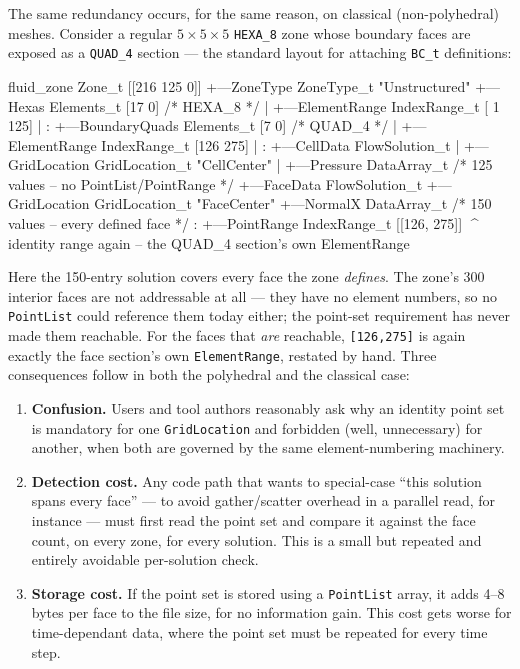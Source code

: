 \documentclass[11pt,letterpaper]{article}
\makeatletter
\let\cgns@orig@lstlisting\lstlisting
\let\cgns@endorig@lstlisting\endlstlisting
\renewenvironment{lstlisting}
  {\par\needspace{5\baselineskip}\nolinenumbers\cgns@orig@lstlisting}
  {\cgns@endorig@lstlisting\par\linenumbers}
\makeatother
\begin{document}
The same redundancy occurs, for the same reason, on classical
(non-polyhedral) meshes. Consider a regular $5{\times}5{\times}5$
\texttt{HEXA\_8} zone whose boundary faces are exposed as a
\texttt{QUAD\_4} section --- the standard layout for attaching
\texttt{BC\_t} definitions:

\begin{lstlisting}[language=C]
fluid_zone Zone_t [[216  125  0]]
+---ZoneType ZoneType_t "Unstructured"
+---Hexas Elements_t [17  0]           /* HEXA_8 */
|   +---ElementRange IndexRange_t [  1 125]
|   :
+---BoundaryQuads Elements_t [7  0]    /* QUAD_4 */
|   +---ElementRange IndexRange_t [126 275]
|   :
+---CellData FlowSolution_t
|   +---GridLocation GridLocation_t "CellCenter"
|   +---Pressure DataArray_t   /* 125 values -- no PointList/PointRange */
+---FaceData FlowSolution_t
    +---GridLocation GridLocation_t "FaceCenter"
    +---NormalX DataArray_t     /* 150 values -- every defined face */
    :
    +---PointRange IndexRange_t [[126, 275]]
        ^^^^ identity range again -- the QUAD_4 section's own ElementRange
\end{lstlisting}

Here the 150-entry solution covers every face the zone \emph{defines}.
The zone's 300 interior faces are not addressable at all --- they have no
element numbers, so no \texttt{PointList} could reference them today
either; the point-set requirement has never made them reachable. For the
faces that \emph{are} reachable, \texttt{[126,275]} is again exactly the
face section's own \texttt{ElementRange}, restated by hand. Three
consequences follow in both the polyhedral and the classical case:

\begin{enumerate}[leftmargin=2em]
\item \textbf{Confusion.} Users and tool authors reasonably ask why an
  identity point set is mandatory for one \texttt{GridLocation} and
  forbidden (well, unnecessary) for another, when both are governed by the
  same element-numbering machinery.
\item \textbf{Detection cost.} Any code path that wants to special-case
  ``this solution spans every face'' --- to avoid gather/scatter
  overhead in a parallel read, for instance --- must first read the point
  set and compare it against the face count, on every zone, for every
  solution. This is a small but repeated and entirely avoidable
  per-solution check.
\item \textbf{Storage cost.} If the point set is stored using a
  \texttt{PointList} array, it adds 4--8 bytes per face to the file size,
  for no information gain. This cost gets worse for time-dependant data, where
  the point set must be repeated for every time step.
\end{enumerate}
\end{document}
